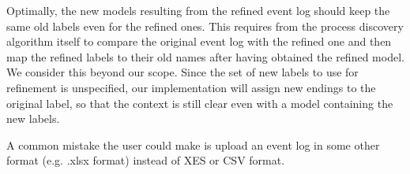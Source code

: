 \documentclass[notitlepage]{article}
\begin{document}
\begin{flushleft}
Optimally, the new models resulting from the refined event log should keep the same old labels even for the refined ones.
This requires from the process discovery algorithm itself to compare the original event log with the refined one and then map the refined labels to their old names after having obtained the refined model.
We consider this beyond our scope.
Since the set of new labels to use for refinement is unspecified, our implementation will assign new endings to the original label, so that the context is still clear even with a model containing the new labels.

A common mistake the user could make is upload an event log in some other format (e.g. .xlsx format) instead of XES or CSV format.





\end{flushleft}
\end{document}
